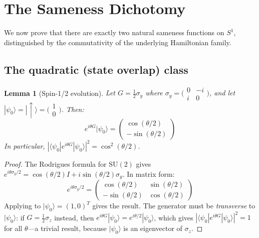 \documentclass[11pt,letterpaper]{article}
\newtheorem{lemma}[theorem]{Lemma}
\begin{document}
\section{The Sameness Dichotomy}

We now prove that there are exactly two natural sameness functions on $S^1$, distinguished by the commutativity of the underlying Hamiltonian family.

\subsection{The quadratic (state overlap) class}

\begin{lemma}[Spin-1/2 evolution]\label{lem:spin12}
Let $G = \tfrac{1}{2}\sigma_y$ where $\sigma_y = \bigl(\begin{smallmatrix} 0 & -i \\ i & 0 \end{smallmatrix}\bigr)$, and let $|\psi_0\rangle = |{\uparrow}\rangle = \bigl(\begin{smallmatrix} 1 \\ 0 \end{smallmatrix}\bigr)$. Then:
\begin{equation}
e^{i\theta G}|\psi_0\rangle = \begin{pmatrix} \cos(\theta/2) \\ -\sin(\theta/2) \end{pmatrix}
\end{equation}
In particular, $|\langle\psi_0|e^{i\theta G}|\psi_0\rangle|^2 = \cos^2(\theta/2)$.
\end{lemma}

\begin{proof}
The Rodrigues formula for $\text{SU}(2)$ gives $e^{i\theta\sigma_y/2} = \cos(\theta/2)I + i\sin(\theta/2)\sigma_y$. In matrix form:
\begin{equation}
e^{i\theta\sigma_y/2} = \begin{pmatrix} \cos(\theta/2) & \sin(\theta/2) \\ -\sin(\theta/2) & \cos(\theta/2) \end{pmatrix}
\end{equation}
Applying to $|\psi_0\rangle = (1, 0)^T$ gives the result. The generator must be \emph{transverse} to $|\psi_0\rangle$: if $G = \tfrac{1}{2}\sigma_z$ instead, then $e^{i\theta G}|\psi_0\rangle = e^{i\theta/2}|\psi_0\rangle$, which gives $|\langle\psi_0|e^{i\theta G}|\psi_0\rangle|^2 = 1$ for all $\theta$---a trivial result, because $|\psi_0\rangle$ is an eigenvector of $\sigma_z$.
\end{proof}
\end{document}
